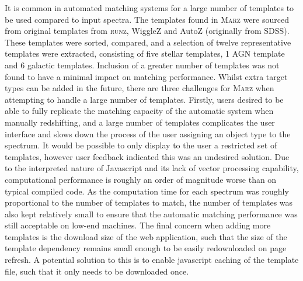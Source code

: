 \documentclass[iop]{emulateapj}
\newcommand{\runz}{\textsc{runz}}
\newcommand{\marz}{\textsc{Marz}}
\begin{document}
It is common in automated matching systems for a large number of templates to be used compared to input spectra. The templates found in \marz{} were sourced from original templates from \runz{}, WiggleZ and AutoZ (originally from SDSS). These templates were sorted, compared, and a selection of twelve representative templates were extracted, consisting of five stellar templates, 1 AGN template and 6 galactic templates. Inclusion of a greater number of templates was not found to have a minimal impact on matching performance. Whilst extra target types can be added in the future, there are three challenges for \marz{} when attempting to handle a large number of templates. Firstly, users desired to be able to fully replicate the matching capacity of the automatic system when manually redshifting, and a large number of templates complicates the user interface and slows down the process of the user assigning an object type to the spectrum. It would be possible to only display to the user a restricted set of templates, however user feedback indicated this was an undesired solution. Due to the interpreted nature of Javascript and its lack of vector processing capability, computational performance is roughly an order of magnitude worse than on typical compiled code. As the computation time for each spectrum was roughly proportional to the number of templates to match, the number of templates was also kept relatively small to ensure that the automatic matching performance was still acceptable on low-end machines. The final concern when adding more templates is the download size of the web application, such that the size of the template dependency remains small enough to be easily redownloaded on page refresh. A potential solution to this is to enable javascript caching of the template file, such that it only needs to be downloaded once.
\end{document}
